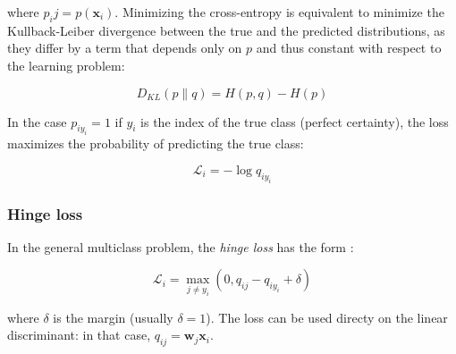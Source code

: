 \documentclass{article}
\begin{document}
where $p_ij = p(\mathbf{x}_i)$. Minimizing the cross-entropy is equivalent to
minimize the Kullback-Leiber divergence between the true and the predicted
distributions, as they differ by a term that depends only on $p$ and thus
constant with respect to the learning problem:

\begin{equation*}
D_{KL}(p\|q) = H(p, q) - H(p) 
\end{equation*}

In the case $p_{iy_i} = 1$ if $y_i$ is the index of the true class (perfect
certainty), the loss maximizes the probability of predicting the true class:

\begin{equation*}
\mathcal{L}_i = - \log q_{iy_i}
\end{equation*}


\subsubsection{Hinge loss}

In the general multiclass problem, the \emph{hinge loss} has the form
\cite{Crammer2001}:

\begin{equation*}
\mathcal{L}_i = \max_{j \neq y_i}(0, q_{ij} - q_{iy_i} + \delta)
\end{equation*}

where $\delta$ is the margin (usually $\delta = 1$). The loss can be used
directy on the linear discriminant: in that case, $q_{ij} = \mathbf{w}_j
\mathbf{x}_i$.



 

\end{document}
